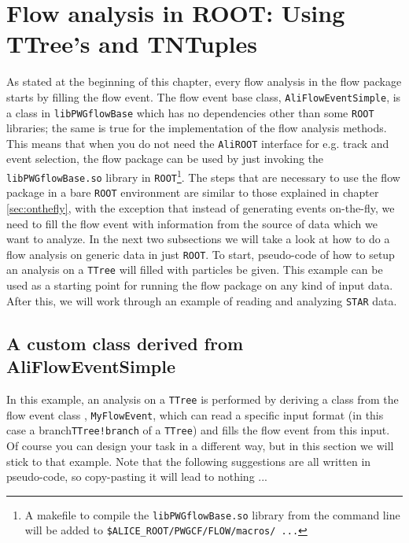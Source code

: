 \documentclass[a4paper]{book}
\numberwithin{equation}{subsection}
\begin{document}
\section{Flow analysis in ROOT: Using TTree's and TNTuples}
As stated at the beginning of this chapter, every flow analysis in the flow package starts by filling the flow event. The flow event base class, \texttt{AliFlowEventSimple}, is a class in \texttt{libPWGflowBase} which has no dependencies other than some \texttt{ROOT} libraries; the same is true for the implementation of the flow analysis methods. This means that when you do not need the \texttt{AliROOT} interface for e.g. track and event selection, the flow package can be used by just invoking the \texttt{libPWGflowBase.so} library in \texttt{ROOT}\footnote{A makefile to compile the \texttt{libPWGflowBase.so} library from the command line will be added to \texttt{\$ALICE\_ROOT/PWGCF/FLOW/macros/ ...}}. The steps that are necessary to use the flow package in a bare \texttt{ROOT} environment are similar to those explained in chapter \ref{sec:onthefly}, with the exception that instead of generating events on-the-fly, we need to fill the flow event with information from the source of data which we want to analyze. In the next two subsections we will take a look at how to do a flow analysis on generic data in just \texttt{ROOT}. To start, pseudo-code of how to setup an analysis on a \texttt{TTree} will filled with particles be given. This example can be used as a starting point for running the flow package on any kind of input data. After this, we will work through an example of reading and analyzing \texttt{STAR} data. 

\subsection{A custom class derived from AliFlowEventSimple}
In this example, an analysis on a \texttt{TTree} is performed by deriving a class from the flow event class , \texttt{MyFlowEvent}, which can read a specific input format (in this case a branch\texttt{TTree!branch} of a \texttt{TTree}) and fills the flow event from this input. Of course you can design your task in a different way, but in this section we will stick to that example. Note that the following suggestions are all written in pseudo-code, so copy-pasting it will lead to nothing ...
\end{document}
